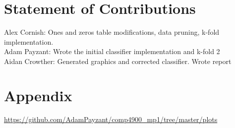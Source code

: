 \section{Statement of Contributions}

Alex Cornish: Ones and zeros table modifications, data pruning, k-fold implementation. \\
Adam Payzant: Wrote the initial classifier implementation and k-fold 2 \\
Aidan Crowther: Generated graphics and corrected classifier. Wrote report

\section{Appendix}

\url{https://github.com/AdamPayzant/comp4900_mp1/tree/master/plots}



